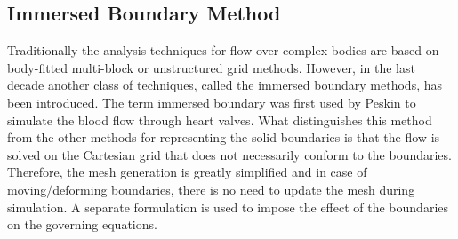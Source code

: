 \subsection{Immersed Boundary Method}
Traditionally the analysis techniques for flow over complex bodies are based on body-fitted multi-block or unstructured grid methods. However, in the last decade another class of techniques, called the immersed boundary methods, has been introduced. The term immersed boundary was first used by Peskin \cite{peskin1977numerical} to simulate the blood flow through heart valves. What distinguishes this method from the other methods for representing the solid boundaries is that the flow is solved on the Cartesian grid that does not necessarily conform to the boundaries. Therefore, the mesh generation is greatly simplified and in case of moving/deforming boundaries, there is no need to update the mesh during simulation. A separate formulation is used to impose the effect of the boundaries on the governing equations.

